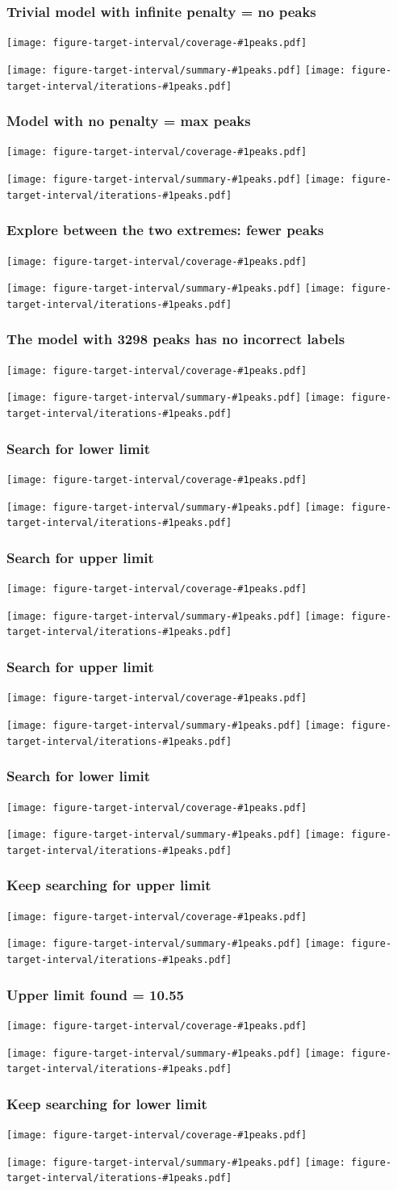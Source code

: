 \documentclass{beamer}
\begin{document}
\newcommand{\showboth}[1]{
  \texttt{[image: figure-target-interval/coverage-\#1peaks.pdf]}

  \texttt{[image: figure-target-interval/summary-\#1peaks.pdf]}
  \texttt{[image: figure-target-interval/iterations-\#1peaks.pdf]}
} 

\begin{frame}
  \frametitle{Trivial model with infinite penalty = no peaks}
  \showboth{0}
\end{frame}

\begin{frame}
  \frametitle{Model with no penalty = max peaks}
  \showboth{711188}%
\end{frame}

\begin{frame}
  \frametitle{Explore between the two extremes: fewer peaks}
  \showboth{48386}
\end{frame}

\begin{frame}
  \frametitle{The model with 3298 peaks has no incorrect labels }
  \showboth{3298}
\end{frame}

\begin{frame}
  \frametitle{Search for lower limit}
  \showboth{17697}
\end{frame}

\begin{frame}
  \frametitle{Search for upper limit}
  \showboth{641}
\end{frame}

\begin{frame}
  \frametitle{Search for upper limit}
  \showboth{1516}
\end{frame}

\begin{frame}
  \frametitle{Search for lower limit}
  \showboth{8350}
\end{frame}


\begin{frame}
  \frametitle{Keep searching for upper limit}
  \showboth{703}
\end{frame}

\begin{frame}
  \frametitle{Upper limit found = 10.55}
  \showboth{702}
\end{frame}
 
\begin{frame}
  \frametitle{Keep searching for lower limit}
  \showboth{5280}
\end{frame}
\end{document}
